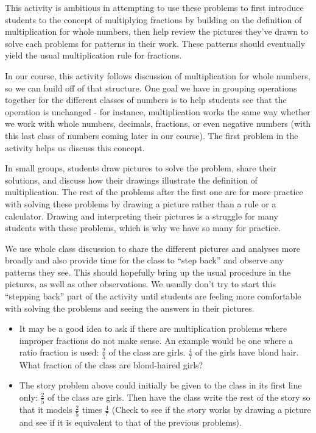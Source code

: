\documentclass[nooutcomes,noauthor,handout]{ximera}
\begin{document}
\newpage
\begin{instructorNotes}
This activity is ambitious in attempting to use these problems to first introduce students to the concept of multiplying fractions by building on the definition of multiplication for whole numbers, then help review the pictures they've drawn to solve each problems for patterns in their work.  These patterns should eventually yield the usual multiplication rule for fractions.  

In our course, this activity follows discussion of multiplication for whole numbers, so we can build off of that structure.  One goal we have in grouping operations together for the different classes of numbers is to help students see that the operation is unchanged - for instance, multiplication works the same way whether we work with whole numbers, decimals, fractions, or even negative numbers (with this last class of numbers coming later in our course).  The first problem in the activity helps us discuss this concept.

In small groups, students draw pictures to solve the problem, share their solutions, and discuss how their drawings illustrate the definition of multiplication.  The rest of the problems after the first one are for more practice with solving these problems by drawing a picture rather than a rule or a calculator.  Drawing and interpreting their pictures is a struggle for many students with these problems, which is why we have so many for practice.

We use whole class discussion to share the different pictures and analyses more broadly and also provide time for the class to ``step back''  and observe any patterns they see.  This should hopefully bring up the usual procedure in the pictures, as well as other observations.  We usually don't try to start this ``stepping back'' part of the activity until students are feeling more comfortable with solving the problems and seeing the answers in their pictures.

\begin{itemize}
     \item It may be a good idea to ask if there are multiplication problems where improper fractions do not make sense.  An example would be one where a ratio fraction is used:  $\frac{2}{5}$ of the class are girls.  $\frac{4}{7}$ of the girls have blond hair.  What fraction of the class are blond-haired girls?
     \item  The story problem above could initially be given to the class in its first line only:  $\frac{2}{5}$ of the class are girls.  Then have the class write the rest of the story so that it models $\frac{2}{5}$ times $\frac{4}{7}$ (Check to see if the story works by drawing a picture and see if it is equivalent to that of the previous problems).
\end{itemize}


\end{instructorNotes}
\end{document}
